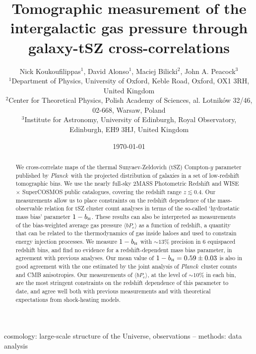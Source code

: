 \documentclass[useAMS,usenatbib]{mn2e}
\title[Tomographic measurement of the intergalactic gas pressure through galaxy-tSZ cross-correlations]{Tomographic measurement of the intergalactic gas pressure through galaxy-tSZ cross-correlations}
\author[Koukoufilippas et al.]{Nick Koukoufilippas$^1$, David Alonso$^1$, Maciej Bilicki$^2$, John A. Peacock$^3$\\
                      $^{1}$Department of Physics, University of Oxford, Keble Road, Oxford, OX1 3RH, United Kingdom\\
                      $^{2}$Center for Theoretical Physics, Polish Academy of Sciences, al. Lotnik\'ow 32/46, 02-668, Warsaw, Poland\\
                      $^{3}$Institute for Astronomy, University of Edinburgh, Royal Observatory, Edinburgh, EH9 3HJ, United Kingdom
                      }
\def\bH{b_{\scriptscriptstyle\rm H}}
\def\planck{{\it Planck\/}}
\begin{document}
  \date{\today}
   
  \maketitle

\begin{abstract}
    We cross-correlate maps of the thermal Sunyaev-Zeldovich (tSZ) Compton-$y$ parameter published by \planck\ with the projected distribution of galaxies in a set of low-redshift tomographic bins. We use the nearly full-sky 2MASS Photometric Redshift and WISE $\times$ SuperCOSMOS public catalogues, covering the redshift range $z\lesssim0.4$. Our measurements allow us to place constraints on the redshift dependence of the mass-observable relation for tSZ cluster count analyses in terms of the so-called `hydrostatic mass bias' parameter $1-\bH$. These results can also be interpreted as measurements of the bias-weighted average gas pressure $\langle bP_e\rangle$ as a function of redshift, a quantity that can be related to the thermodynamics of gas inside haloes and used to constrain energy injection processes. We measure $1-\bH$ with $\sim13\%$ precision in 6 equispaced redshift bins, and find no evidence for a redshift-dependent mass bias parameter, in agreement with previous analyses. Our mean value of $1-\bH = 0.59\pm0.03$ is also in good agreement with the one estimated by the joint analysis of \planck\ cluster counts and CMB anisotropies. Our measurements of $\langle bP_e\rangle$, at the level of $\sim10\%$ in each bin, are the most stringent constraints on the redshift dependence of this parameter to date, and agree well both with previous measurements and with theoretical expectations from shock-heating models.
\end{abstract}

\begin{keywords}
  cosmology: large-scale structure of the Universe, observations -- methods: data analysis
\end{keywords}
\end{document}
